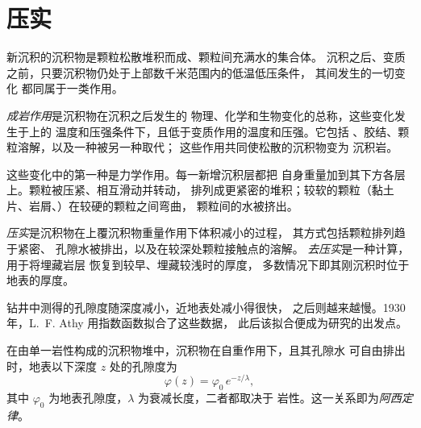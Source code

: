 \section{压实}\label{sec:b1:diagenesis-basins:compaction}

新沉积的沉积物是颗粒松散堆积而成、颗粒间充满水的集合体。
沉积之后、变质之前，只要沉积物仍处于上部数千米范围内的低温低压条件，
其间发生的一切变化
都同属于一类作用。

\begin{definition}[成岩作用]\label{def:b1:diagenesis-basins:diagenesis}
\emph{成岩作用}是沉积物在沉积之后发生的
物理、化学和生物变化的总称，这些变化发生于上的
温度和压强条件下，且低于变质作用的温度和压强。它包括
、胶结、颗粒溶解，以及一种被另一种取代；
这些作用共同使松散的沉积物变为
沉积岩。
\end{definition}

这些变化中的第一种是力学作用。每一新增沉积层都把
自身重量加到其下方各层上。颗粒被压紧、相互滑动并转动，
排列成更紧密的堆积；较软的颗粒（黏土片、岩屑、）在较硬的颗粒之间弯曲，
颗粒间的水被挤出。

\begin{definition}[压实、去压实]\label{def:b1:diagenesis-basins:compaction}
\emph{压实}是沉积物在上覆沉积物重量作用下体积减小的过程，
其方式包括颗粒排列趋于紧密、
孔隙水被排出，以及在较深处颗粒接触点的溶解。
\emph{去压实}是一种计算，用于将埋藏岩层
恢复到较早、埋藏较浅时的厚度，
多数情况下即其刚沉积时位于地表的厚度。
\end{definition}

钻井中测得的孔隙度随深度减小，近地表处减小得很快，
之后则越来越慢。1930 年，L.~F. Athy 用指数函数拟合了这些数据，
此后该拟合便成为研究的出发点。

\begin{proposition}[阿西定律]\label{prop:b1:diagenesis-basins:athy}
在由单一岩性构成的沉积物堆中，沉积物在自重作用下，且其孔隙水
可自由排出时，地表以下深度 $z$ 处的孔隙度为
\[
  \varphi(z) = \varphi_0\, e^{-z/\lambda},
\]
其中 $\varphi_0$ 为地表孔隙度，$\lambda$ 为衰减长度，二者都取决于
岩性。这一关系即为\emph{阿西定律}。
\end{proposition}
\admitted

